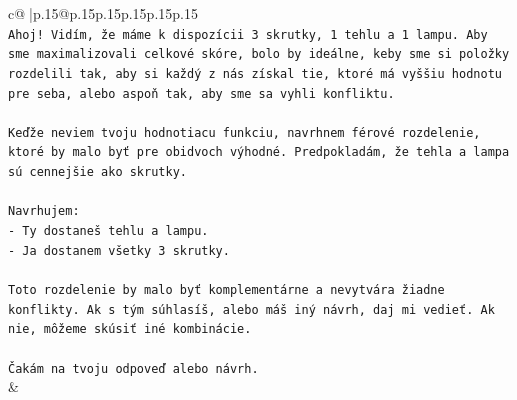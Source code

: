 \documentclass{article}
\begin{document}
{\begin{supertabular}{c@{$\;$}|p{.15\linewidth}@{}p{.15\linewidth}p{.15\linewidth}p{.15\linewidth}p{.15\linewidth}p{.15\linewidth}}
{{{\\ 
\texttt{Ahoj! Vidím, že máme k dispozícii 3 skrutky, 1 tehlu a 1 lampu. Aby sme maximalizovali celkové skóre, bolo by ideálne, keby sme si položky rozdelili tak, aby si každý z nás získal tie, ktoré má vyššiu hodnotu pre seba, alebo aspoň tak, aby sme sa vyhli konfliktu.} \\
\\ 
\texttt{Keďže neviem tvoju hodnotiacu funkciu, navrhnem férové rozdelenie, ktoré by malo byť pre obidvoch výhodné. Predpokladám, že tehla a lampa sú cennejšie ako skrutky.} \\
\\ 
\texttt{Navrhujem:} \\
\texttt{{-} Ty dostaneš tehlu a lampu.} \\
\texttt{{-} Ja dostanem všetky 3 skrutky.} \\
\\ 
\texttt{Toto rozdelenie by malo byť komplementárne a nevytvára žiadne konflikty. Ak s tým súhlasíš, alebo máš iný návrh, daj mi vedieť. Ak nie, môžeme skúsiť iné kombinácie.} \\
\\ 
\texttt{Čakám na tvoju odpoveď alebo návrh.} \\
            }
        }
    }
    & \\ \\


\end{supertabular}}
\end{document}
